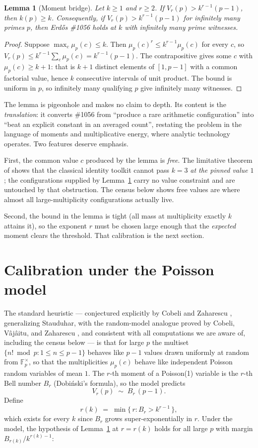 \documentclass[11pt]{article}
\newtheorem{lemma}[theorem]{Lemma}
\theoremstyle{definition}
\theoremstyle{remark}
\newcommand{\F}{\mathbb{F}}
\begin{document}
\begin{lemma}[Moment bridge]\label{lem:bridge}
Let $k \ge 1$ and $r \ge 2$. If $V_r(p) > k^{r-1}(p-1)$, then
$k(p) \ge k$. Consequently, if $V_r(p) > k^{r-1}(p-1)$ for infinitely many
primes $p$, then Erd\H{o}s \#1056 holds at $k$ with infinitely many prime
witnesses.
\end{lemma}

\begin{proof}
Suppose $\max_c \mu_p(c) \le k$. Then
$\mu_p(c)^r \le k^{r-1}\mu_p(c)$ for every $c$, so
$V_r(p) \le k^{r-1} \sum_c \mu_p(c) = k^{r-1}(p-1)$. The contrapositive
gives some $c$ with $\mu_p(c) \ge k+1$: that is $k+1$ distinct elements of
$[1,p-1]$ with a common factorial value, hence $k$ consecutive intervals of
unit product. The bound is uniform in $p$, so infinitely many qualifying
$p$ give infinitely many witnesses.
\end{proof}

The lemma is pigeonhole and makes no claim to depth. Its content is the
\emph{translation}: it converts \#1056 from ``produce a rare arithmetic
configuration'' into ``beat an explicit constant in an averaged count'',
restating the problem in the language of moments and multiplicative
energy, where analytic technology operates. Two features deserve emphasis.

First, the common value $c$ produced by the lemma is \emph{free}. The
limitative theorem of \cite{Hino} shows that the classical identity toolkit
cannot pass $k = 3$ \emph{at the pinned value $1$}; the configurations
supplied by Lemma~\ref{lem:bridge} carry no value constraint and are
untouched by that obstruction. The census below shows free values are where
almost all large-multiplicity configurations actually live.

Second, the bound in the lemma is tight (all mass at multiplicity exactly
$k$ attains it), so the exponent $r$ must be chosen large enough that the
\emph{expected} moment clears the threshold. That calibration is the next
section.

\section{Calibration under the Poisson model}

The standard heuristic --- conjectured explicitly by Cobeli and Zaharescu
\cite{CZ}, generalizing Stauduhar, with the random-model analogue proved
by Cobeli, V\^aj\^aitu, and Zaharescu \cite{CVZ}, and consistent with all
computations we are aware of, including the census below --- is that for
large $p$ the multiset $\{ n! \bmod p : 1 \le n \le p-1 \}$ behaves like
$p-1$ values drawn uniformly at random from $\F_p^\times$, so that the
multiplicities $\mu_p(c)$ behave like independent Poisson random
variables of mean $1$.
The $r$-th moment of a Poisson(1) variable is the $r$-th Bell number $B_r$
(Dobi\'nski's formula), so the model predicts
\[
  V_r(p) \;\sim\; B_r \,(p-1).
\]
Define
\[
  r(k) \;=\; \min\{\, r : B_r > k^{r-1} \,\},
\]
which exists for every $k$ since $B_r$ grows super-exponentially in $r$.
Under the model, the hypothesis of Lemma~\ref{lem:bridge} at $r = r(k)$
holds for all large $p$ with margin $B_{r(k)}/k^{r(k)-1}$:
\end{document}
